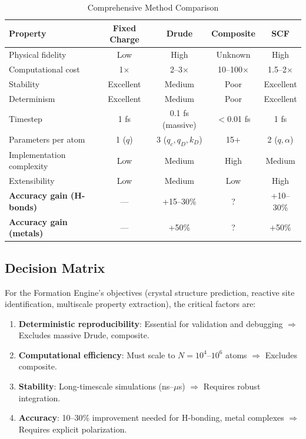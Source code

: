 \documentclass[11pt,letterpaper]{article}
\begin{document}
\begin{table}[h]
\centering
\caption{Comprehensive Method Comparison}
\label{tab:comparison}
\begin{tabular}{@{}lcccc@{}}
\toprule
\textbf{Property} & \textbf{Fixed Charge} & \textbf{Drude} & \textbf{Composite} & \textbf{SCF} \\
\midrule
Physical fidelity & Low & High & Unknown & High \\
Computational cost & 1$\times$ & 2--3$\times$ & 10--100$\times$ & 1.5--2$\times$ \\
Stability & Excellent & Medium & Poor & Excellent \\
Determinism & Excellent & Medium & Poor & Excellent \\
Timestep & 1 fs & 0.1 fs (massive) & $<$0.01 fs & 1 fs \\
Parameters per atom & 1 ($q$) & 3 ($q_c, q_D, k_D$) & 15+ & 2 ($q, \alpha$) \\
Implementation complexity & Low & Medium & High & Medium \\
Extensibility & Low & Medium & Low & High \\
\textbf{Accuracy gain (H-bonds)} & --- & +15--30\% & ? & +10--30\% \\
\textbf{Accuracy gain (metals)} & --- & +50\% & ? & +50\% \\
\bottomrule
\end{tabular}
\end{table}

\subsection{Decision Matrix}

For the Formation Engine's objectives (crystal structure prediction, reactive site identification, multiscale property extraction), the critical factors are:

\begin{enumerate}
    \item \textbf{Deterministic reproducibility}: Essential for validation and debugging $\Rightarrow$ Excludes massive Drude, composite.
    \item \textbf{Computational efficiency}: Must scale to $N = 10^4$--$10^6$ atoms $\Rightarrow$ Excludes composite.
    \item \textbf{Stability}: Long-timescale simulations (ns--$\mu$s) $\Rightarrow$ Requires robust integration.
    \item \textbf{Accuracy}: 10--30\% improvement needed for H-bonding, metal complexes $\Rightarrow$ Requires explicit polarization.
\end{enumerate}
\end{document}
